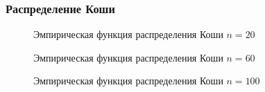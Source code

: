 \documentclass{article}
\begin{document}
\newpage
\subsubsection{Распределение Коши}

\begin{figure}[h]
\caption{Эмпирическая функция распределения Коши $n=20$}
\end{figure}

\begin{figure}[h]
\caption{Эмпирическая функция распределения Коши $n=60$}
\end{figure}

\begin{figure}[h]
\caption{Эмпирическая функция распределения Коши $n=100$}
\end{figure}
\end{document}
